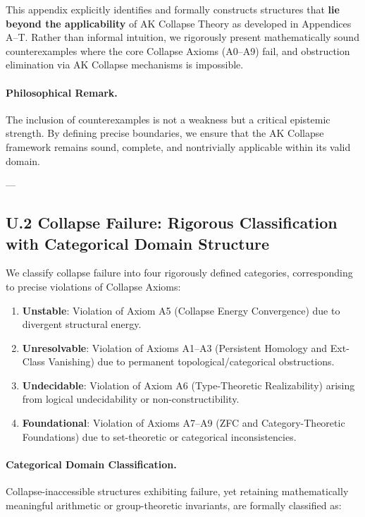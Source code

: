 \documentclass[11pt]{article}
\begin{document}
This appendix explicitly identifies and formally constructs structures that \textbf{lie beyond the applicability} of AK Collapse Theory as developed in Appendices A–T.  
Rather than informal intuition, we rigorously present mathematically sound counterexamples where the core Collapse Axioms (A0–A9) fail, and obstruction elimination via AK Collapse mechanisms is impossible.

\paragraph{Philosophical Remark.}  
The inclusion of counterexamples is not a weakness but a critical epistemic strength.  
By defining precise boundaries, we ensure that the AK Collapse framework remains sound, complete, and nontrivially applicable within its valid domain.

---

\subsection*{U.2 Collapse Failure: Rigorous Classification with Categorical Domain Structure}

We classify collapse failure into four rigorously defined categories, corresponding to precise violations of Collapse Axioms:

\begin{enumerate}
    \item \textbf{Unstable}: Violation of Axiom A5 (Collapse Energy Convergence) due to divergent structural energy.
    \item \textbf{Unresolvable}: Violation of Axioms A1–A3 (Persistent Homology and Ext-Class Vanishing) due to permanent topological/categorical obstructions.
    \item \textbf{Undecidable}: Violation of Axiom A6 (Type-Theoretic Realizability) arising from logical undecidability or non-constructibility.
    \item \textbf{Foundational}: Violation of Axioms A7–A9 (ZFC and Category-Theoretic Foundations) due to set-theoretic or categorical inconsistencies.
\end{enumerate}

\paragraph{Categorical Domain Classification.}

Collapse-inaccessible structures exhibiting failure, yet retaining mathematically meaningful arithmetic or group-theoretic invariants, are formally classified as:
\end{document}
